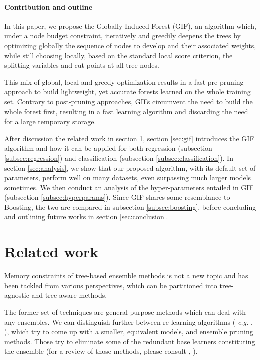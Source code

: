 \documentclass{article}
\begin{document}
\vspace*{-\baselineskip}

\paragraph{Contribution and outline}
In this paper, we propose the Globally Induced Forest (GIF), an algorithm 
which, under a node budget constraint, iteratively and greedily deepens the 
trees by optimizing globally the sequence of nodes to develop and their 
associated weights, while still choosing locally, based on the standard local 
score criterion, the splitting variables and cut points at all tree nodes. 

This mix of global, local and greedy optimization results in a fast pre-pruning 
approach to build lightweight, yet accurate forests learned on the whole 
training set. Contrary to post-pruning approaches, GIFs circumvent the need to 
build the whole forest first, resulting in a fast learning algorithm and 
discarding the need for a large temporary storage.

After discussion the related work in section \ref{sec:relatedWork}, section 
\ref{sec:gif} introduces the GIF algorithm and how it can be 
applied for both regression (subsection \ref{subsec:regression}) and 
classification (subsection \ref{subsec:classification}). 
In section \ref{sec:analysis}, we show that our proposed algorithm, with its 
default set of parameters, perform well on many datasets, even surpassing much 
larger models sometimes. We then conduct an analysis of the hyper-parameters 
entailed in GIF (subsection \ref{subsec:hyperparams}). Since GIF shares some 
resemblance to Boosting, the two are compared in subsection 
\ref{subsec:boosting}, before concluding and outlining future works in section 
\ref{sec:conclusion}. 


\section{Related work}
\label{sec:relatedWork}
Memory constraints of tree-based ensemble methods is not a new topic and has 
been tackled from various perspectives, which can be partitioned into 
tree-agnostic and tree-aware methods.

The former set of techniques are general purpose methods which can deal with  
any ensembles. We can distinguish further between re-learning algorithms ({\it 
e.g.} \cite{domingos1997oracle}, \cite{menke2009oracle}), which try to come 
up with a smaller, equivalent models, and ensemble pruning methods. Those try 
to eliminate some of the redundant base learners constituting the ensemble (for 
a review of those methods, please consult \cite{tsoumakas2008enspruning}, 
\cite{rokach2016enspruning}). 
\end{document}
